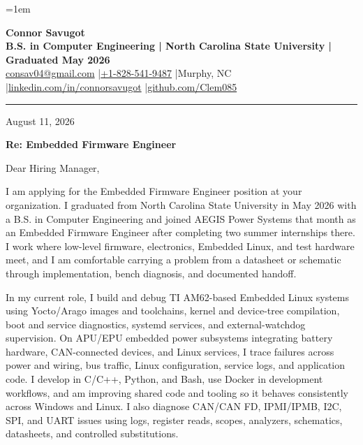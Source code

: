 \documentclass[10pt,letterpaper]{article}
\newcommand{\LetterDate}{August 11, 2026}
\newcommand{\TargetRole}{Embedded Firmware Engineer}
\newcommand{\TargetCompany}{your organization}
\begin{document}
\fontsize{10.35}{12.65}\selectfont
\RaggedRight
\setlength{\RaggedRightRightskip}{0pt plus 5em}
\emergencystretch=1em

\begin{center}
  {\fontsize{22}{23}\selectfont\bfseries Connor Savugot}\\[2pt]
  {\bfseries B.S. in Computer Engineering | North Carolina State University | Graduated May 2026}\\[2pt]
  {\fontsize{9.7}{10.5}\selectfont
    \href{mailto:consav04@gmail.com}{consav04@gmail.com}
    \enspace|\enspace \href{tel:+18285419487}{+1-828-541-9487}
    \enspace|\enspace Murphy, NC
    \enspace|\enspace \href{https://linkedin.com/in/connorsavugot}{linkedin.com/in/connorsavugot}
    \enspace|\enspace \href{https://github.com/Clem085}{github.com/Clem085}}
\end{center}

\vspace{-0.15em}
\hrule
\vspace{0.8em}

\LetterDate

\textbf{Re: \TargetRole}

Dear Hiring Manager,

I am applying for the \TargetRole{} position at \TargetCompany. I graduated from North Carolina State University in May 2026 with a B.S. in Computer Engineering and joined AEGIS Power Systems that month as an Embedded Firmware Engineer after completing two summer internships there. I work where low-level firmware, electronics, Embedded Linux, and test hardware meet, and I am comfortable carrying a problem from a datasheet or schematic through implementation, bench diagnosis, and documented handoff.

In my current role, I build and debug TI AM62-based Embedded Linux systems using Yocto/Arago images and toolchains, kernel and device-tree compilation, boot and service diagnostics, systemd services, and external-watchdog supervision. On APU/EPU embedded power subsystems integrating battery hardware, CAN-connected devices, and Linux services, I trace failures across power and wiring, bus traffic, Linux configuration, service logs, and application code. I develop in C/C++, Python, and Bash, use Docker in development workflows, and am improving shared code and tooling so it behaves consistently across Windows and Linux. I also diagnose CAN/CAN FD, IPMI/IPMB, I2C, SPI, and UART issues using logs, register reads, scopes, analyzers, schematics, datasheets, and controlled substitutions.
\end{document}
